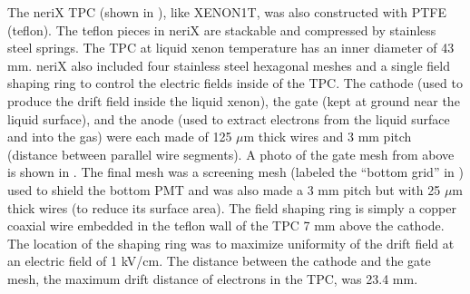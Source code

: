 The neriX TPC (shown in ), like XENON1T, was also constructed with PTFE (teflon).  The teflon pieces in neriX are stackable and compressed by stainless steel springs.  The TPC at liquid xenon temperature has an inner diameter of 43 mm.  neriX also included four stainless steel hexagonal meshes and a single field shaping ring to control the electric fields inside of the TPC.  The cathode (used to produce the drift field inside the liquid xenon), the gate (kept at ground near the liquid surface), and the anode (used to extract electrons from the liquid surface and into the gas) were each made of  125 $\mu$m thick wires and 3 mm pitch (distance between parallel wire segments).  A photo of the gate mesh from above is shown in .  The final mesh was a screening mesh (labeled the ``bottom grid'' in ) used to shield the bottom PMT and was also made a 3 mm pitch but with 25 $\mu$m thick wires (to reduce its surface area).  The field shaping ring is simply a copper coaxial wire embedded in the teflon wall of the TPC 7 mm above the cathode.  The location of the shaping ring was to maximize uniformity of the drift field at an electric field of 1 kV/cm.  The distance between the cathode and the gate mesh, the maximum drift distance of electrons in the TPC, was 23.4 mm.


